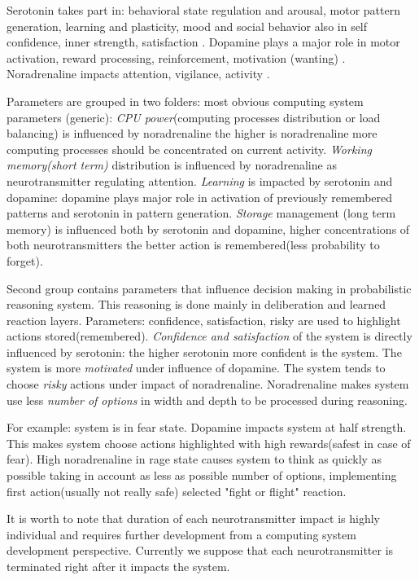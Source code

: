 Serotonin takes part in: behavioral state regulation and arousal, motor pattern generation, learning and plasticity, mood and social behavior \cite{anatomic} also in self confidence, inner strength, satisfaction \cite{cubeofemotions}. Dopamine plays a major role in motor activation, reward processing, reinforcement, motivation (wanting) \cite{cubeofemotions, emotionsbraintorobot, roleofemotions}. Noradrenaline impacts attention, vigilance, activity \cite{cubeofemotions}.

Parameters are grouped in two folders: most obvious computing system parameters (generic):
\emph{CPU power}(computing processes distribution or load balancing) is influenced by noradrenaline the higher is noradrenaline more computing processes should be concentrated on current activity.
\emph{Working memory(short term)} distribution is influenced by noradrenaline as neurotransmitter regulating attention.
\emph{Learning} is impacted by serotonin and dopamine: dopamine plays major role in activation of previously remembered patterns and serotonin in pattern generation.
\emph{Storage} management (long term memory) is influenced both by serotonin and dopamine, higher concentrations of both neurotransmitters the better action is remembered(less probability to forget).

Second group contains parameters that influence decision making in probabilistic reasoning system. This reasoning is done mainly in deliberation and learned reaction layers.
Parameters: confidence, satisfaction, risky are used to highlight actions stored(remembered).
\emph{Confidence and satisfaction} of the system is directly influenced by serotonin: the higher serotonin more confident is the system. 
The system is more \emph{motivated} under influence of dopamine.
The system tends to choose \emph{risky} actions under impact of noradrenaline.
Noradrenaline makes system use less \emph{number of options} in width and depth to be processed during reasoning.

For example: system is in fear state. Dopamine impacts system at half strength. This makes system choose actions highlighted with high rewards(safest in case of fear). High noradrenaline in rage state causes system to think as quickly as possible taking in account as less as possible number of options, implementing first action(usually not really safe) selected "fight or flight" reaction.

It is worth to note that duration of each neurotransmitter impact is highly individual and requires further development from a computing system development perspective. Currently we suppose that each neurotransmitter is terminated right after it impacts the system.

